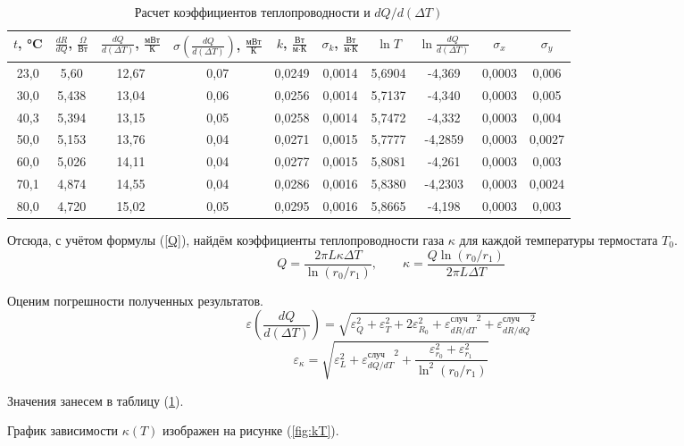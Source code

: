 \documentclass[a4paper,12pt]{article} %
\begin{document}
\begin{enumerate}
    \begin{table}[h!]
      \begin{tabular}{|c|c|c|c|c|c|c|c|c|c|}
        \hline
        $t$, °C&$\frac{dR}{dQ}$, $\frac \Omega{\text{Вт}}$&$\frac{dQ}{d(\Delta T)}$, $\frac {\text{мВт}}{\text{К}}$&$\sigma\left({\frac{dQ}{d (\Delta T)}}\right)$, $\frac {\text{мВт}}{\text{К}}$&$k$, $\frac {\text{Вт}}{\text{м·К}}$&$\sigma_k$, $\frac {\text{Вт}}{\text{м·К}}$&$\ln T$&$\ln \frac{dQ}{d(\Delta T)}$&$\sigma_x$&$\sigma_y$\\ \hline
        23,0&5,60&12,67&0,07&0,0249&0,0014&5,6904&-4,369&0,0003&0,006\\ \hline
        30,0&5,438&13,04&0,06&0,0256&0,0014&5,7137&-4,340&0,0003&0,005\\ \hline
        40,3&5,394&13,15&0,05&0,0258&0,0014&5,7472&-4,332&0,0003&0,004\\ \hline
        50,0&5,153&13,76&0,04&0,0271&0,0015&5,7777&-4,2859&0,0003&0,0027\\ \hline
        60,0&5,026&14,11&0,04&0,0277&0,0015&5,8081&-4,261&0,0003&0,003\\ \hline
        70,1&4,874&14,55&0,04&0,0286&0,0016&5,8380&-4,2303&0,0003&0,0024\\ \hline
        80,0&4,720&15,02&0,05&0,0295&0,0016&5,8665&-4,198&0,0003&0,003\\ \hline
      \end{tabular}
      \caption{Расчет коэффициентов теплопроводности и $dQ/d(\Delta T)$}
      \label{tab:RDQ}
    \end{table}

    Отсюда, с учётом формулы (\ref{Q}), найдём коэффициенты теплопроводности газа $\kappa$ для каждой температуры термостата $T_0$. 
    \[
      Q = \frac{2\pi L \kappa \Delta T}{\ln(r_0 / r_1)}, \qquad \kappa = \frac{Q \ln(r_0 / r_1)}{2\pi L \Delta T}
    \]
    

    Оценим погрешности полученных результатов. 
    \[
      \varepsilon\left({\frac{dQ}{d (\Delta T)}}\right) = \sqrt{\varepsilon_Q^2 + \varepsilon_T^2 + 2\varepsilon_{R_0}^2 + {\varepsilon^\text{случ}_{dR/dT}}^2 + {\varepsilon^\text{случ}_{dR/dQ}}^2}
    \]
    \[
      \varepsilon_{\kappa} = \sqrt{\varepsilon_L^2 + {\varepsilon^\text{случ}_{dQ/dT}}^2 + \frac{\varepsilon_{r_0}^2 + \varepsilon_{r_1}^2}{\ln^2(r_0/r_1)}}
    \]
    
    Значения занесем в таблицу (\ref{tab:RDQ}).

    График зависимости $\kappa (T)$ изображен на рисунке (\ref{fig:kT}).


\end{enumerate}
\end{document}
